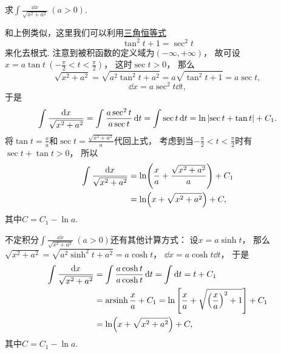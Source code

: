\begin{example}
求\(\int \frac{\dd{x}}{\sqrt{x^2 + a^2}}\ (a>0)\).
\begin{solution}
和上例类似，这里我们可以利用\hyperref[equation:三角函数.毕达哥拉斯三角恒等式2]{三角恒等式}\[
	\tan^2 t + 1 = \sec^2 t
\]来化去根式.
注意到被积函数的定义域为\((-\infty,+\infty)\)，
故可设\(x = a \tan t\ (-\frac\pi2 < t < \frac\pi2)\)，
这时\(\sec t > 0\)，
那么\[
	\sqrt{x^2 + a^2}
	= \sqrt{a^2 \tan^2 t + a^2}
	= a \sqrt{\tan^2 t + 1}
	= a \sec t,
\]\[
	\dd{x} = a \sec^2 t \dd{t},
\]
于是\[
	\int \frac{\dd{x}}{\sqrt{x^2 + a^2}}
	= \int \frac{a \sec^2 t}{a \sec t} \dd{t}
	= \int \sec t \dd{t}
	= \ln\abs{\sec t + \tan t} + C_1.
\]
将\(\tan t = \frac{x}{a}\)和\(\sec t = \frac{\sqrt{x^2+a^2}}{a}\)代回上式，
考虑到当\(-\frac\pi2 < t < \frac\pi2\)时有\(\sec t + \tan t > 0\)，
所以\begin{align}
	\int \frac{\dd{x}}{\sqrt{x^2 + a^2}}
	&= \ln( \frac{x}{a} + \frac{\sqrt{x^2 + a^2}}{a} ) + C_1 \notag \\
	&= \ln(x + \sqrt{x^2 + a^2}) + C,
\end{align}
其中\(C = C_1 - \ln a\).
\end{solution}
\end{example}
\begin{remark}
不定积分\(\int \frac{\dd{x}}{\sqrt{x^2 + a^2}}\ (a>0)\)还有其他计算方式：
设\(x = a \sinh t\)，
那么\(\sqrt{x^2+a^2}
=\sqrt{a^2\sinh^2t+a^2}
=a\cosh t\)，
\(\dd{x}=a\cosh t\dd{t}\)，
于是\begin{align*}
	\int\frac{\dd{x}}{\sqrt{x^2+a^2}}
	&= \int\frac{a\cosh t}{a\cosh t}\dd{t}
	= \int\dd{t}
	= t+C_1 \\
	&= \operatorname{arsinh}\frac{x}{a} + C_1
	= \ln\left[\frac{x}{a}+\sqrt{\left(\frac{x}{a}\right)^2+1}\right] + C_1 \\
	&= \ln(x+\sqrt{x^2+a^2})+C,
\end{align*}
其中\(C=C_1-\ln a\).
\end{remark}

